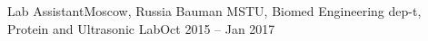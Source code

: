\resumeSubheading
    {Lab Assistant}{Moscow, Russia}
    {Bauman MSTU, Biomed Engineering dep-t, Protein and Ultrasonic Lab}{Oct 2015 -- Jan 2017}